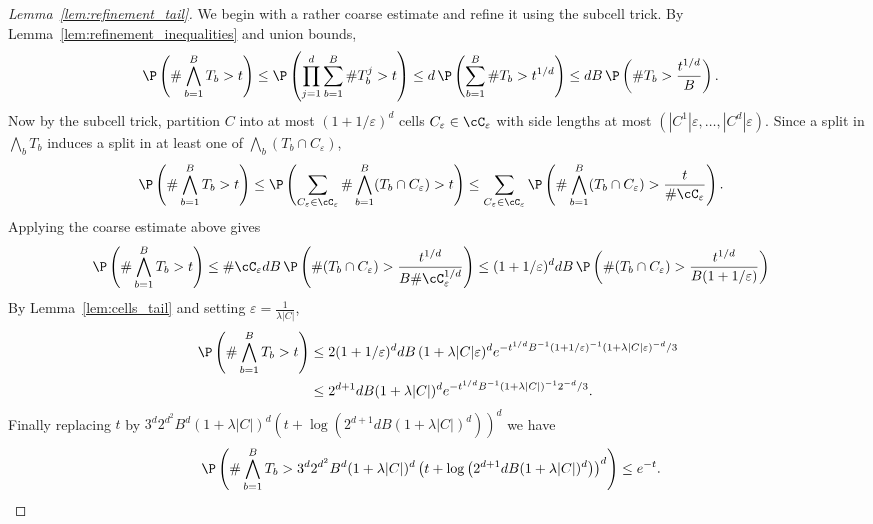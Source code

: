 \documentclass{article}
\begin{document}
\begin{proof}[Lemma~\ref{lem:refinement_tail}]

  We begin with a rather coarse estimate and refine it using
  the subcell trick.
  By Lemma~\ref{lem:refinement_inequalities}
  and union bounds,
  \begin{align*}
    \P\left(
    \# \bigwedge_{b=1}^B T_b
    > t
    \right)
    &\leq
      \P\left(
      \prod_{j=1}^d
      \sum_{b=1}^B \# T_b^j
      > t
      \right)
      \leq
      d\,
      \P\left(
      \sum_{b=1}^B \# T_b
      > t^{1/d}
      \right)
      \leq
      dB\,
      \P\left(
      \# T_b > \frac{t^{1/d}}{B}
      \right).
  \end{align*}
  Now by the subcell trick, partition $C$ into
  at most $(1 + 1/\varepsilon)^d$ cells
  $C_\varepsilon \in \cC_\varepsilon$
  with side lengths at most
  $(|C^1| \varepsilon, \ldots, |C^d| \varepsilon)$.
  Since a split in $\bigwedge_b T_b$ induces a split
  in at least one of
  $\bigwedge_b (T_b \cap C_\varepsilon)$,
  \begin{align*}
    \P\left(
    \# \bigwedge_{b=1}^B T_b
    > t
    \right)
    &\leq
      \P\left(
      \sum_{C_\varepsilon \in \cC_\varepsilon}
      \# \bigwedge_{b=1}^B (T_b \cap C_\varepsilon)
      > t
      \right)
      \leq
      \sum_{C_\varepsilon \in \cC_\varepsilon}
      \P\left(
      \# \bigwedge_{b=1}^B (T_b \cap C_\varepsilon)
      > \frac{t}{\# \cC_\varepsilon}
      \right).
  \end{align*}
  Applying the coarse estimate above gives
  \begin{align*}
    \P\left(
    \# \bigwedge_{b=1}^B T_b
    > t
    \right)
    &\leq
      \# \cC_\varepsilon
      dB\,
      \P\left(
      \# (T_b \cap C_\varepsilon)
      > \frac{t^{1/d}}{B \# \cC_\varepsilon^{1/d}}
      \right)
      \leq
      (1 + 1/\varepsilon)^d
      dB\,
      \P\left(
      \# (T_b \cap C_\varepsilon)
      > \frac{t^{1/d}}{B (1 + 1/\varepsilon)}
      \right)
  \end{align*}
  By Lemma~\ref{lem:cells_tail}
  and setting $\varepsilon = \frac{1}{\lambda |C|}$,
  \begin{align*}
    \P\left(
    \# \bigwedge_{b=1}^B T_b
    > t
    \right)
    &\leq
      2 (1 + 1/\varepsilon)^d
      dB\,
      (1 + \lambda |C| \varepsilon)^d
      e^{-t^{1/d} B^{-1} (1+1/\varepsilon)^{-1}
      (1 + \lambda |C| \varepsilon)^{-d} / 3} \\
    &\leq
      2^{d+1} dB (1 + \lambda |C|)^d
      e^{-t^{1/d} B^{-1} (1+\lambda |C|)^{-1}
      2^{-d} / 3}.
  \end{align*}
  Finally replacing $t$ by
  $3^d 2^{d^2} B^d (1+\lambda|C|)^d
  \left(
    t + \log\left( 2^{d+1} dB (1 + \lambda |C|)^d \right)
  \right)^d$
  we have
  \begin{align*}
    \P\left(
    \# \bigwedge_{b=1}^B T_b
    > 3^d 2^{d^2} B^d (1+\lambda|C|)^d
    \left(
    t + \log\left( 2^{d+1} dB (1 + \lambda |C|)^d \right)
    \right)^d
    \right)
    &\leq e^{-t}.
  \end{align*}
\end{proof}
\end{document}
